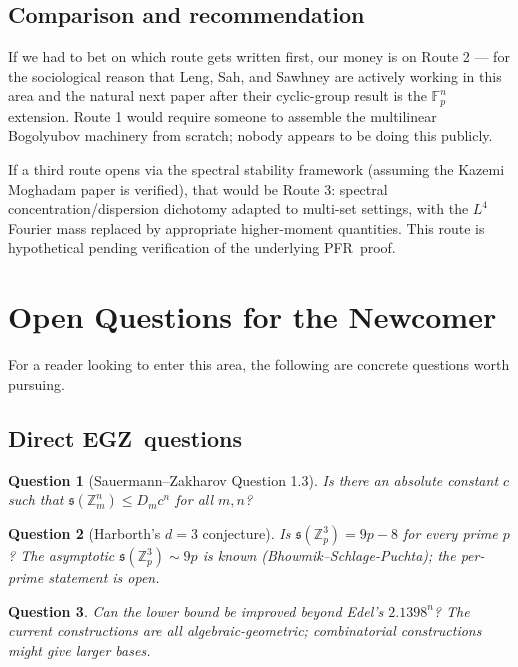 \documentclass[11pt,a4paper]{article}
\theoremstyle{plain}
\newtheorem*{question}{Question}
\theoremstyle{definition}
\theoremstyle{remark}
\newcommand{\F}{\mathbb{F}}
\newcommand{\Z}{\mathbb{Z}}
\newcommand{\sUFp}{\mathfrak{s}}
\newcommand{\PFR}{\textsf{PFR}}
\newcommand{\EGZ}{\textsf{EGZ}}
\begin{document}
\subsection{Comparison and recommendation}

If we had to bet on which route gets written first, our money is on Route 2 --- for the sociological reason that Leng, Sah, and Sawhney are actively working in this area and the natural next paper after their cyclic-group result is the $\F_p^n$ extension. Route 1 would require someone to assemble the multilinear Bogolyubov machinery from scratch; nobody appears to be doing this publicly.

If a third route opens via the spectral stability framework (assuming the Kazemi Moghadam paper is verified), that would be Route 3: spectral concentration/dispersion dichotomy adapted to multi-set settings, with the $L^4$ Fourier mass replaced by appropriate higher-moment quantities. This route is hypothetical pending verification of the underlying \PFR\ proof.

\section{Open Questions for the Newcomer}

For a reader looking to enter this area, the following are concrete questions worth pursuing.

\subsection{Direct \EGZ\ questions}

\begin{question}[Sauermann--Zakharov Question 1.3]
Is there an absolute constant $c$ such that $\sUFp(\Z_m^n) \leq D_m c^n$ for all $m, n$?
\end{question}

\begin{question}[Harborth's $d = 3$ conjecture]
Is $\sUFp(\Z_p^3) = 9p - 8$ for every prime $p$? The asymptotic $\sUFp(\Z_p^3) \sim 9p$ is known (Bhowmik--Schlage-Puchta); the per-prime statement is open.
\end{question}

\begin{question}
Can the lower bound be improved beyond Edel's $2.1398^n$? The current constructions are all algebraic-geometric; combinatorial constructions might give larger bases.
\end{question}
\end{document}
